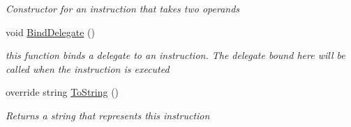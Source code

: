 \begin{DoxyCompactItemize}
\begin{DoxyCompactList}\small\item\em Constructor for an instruction that takes two operands \end{DoxyCompactList}\item 
void \hyperlink{class_c_p_u___o_s___simulator_1_1_c_p_u_1_1_instruction_ab3bbd51fd889e3bbeb656ea717a7fe9c}{Bind\+Delegate} ()
\begin{DoxyCompactList}\small\item\em this function binds a delegate to an instruction. The delegate bound here will be called when the instruction is executed \end{DoxyCompactList}\item 
override string \hyperlink{class_c_p_u___o_s___simulator_1_1_c_p_u_1_1_instruction_a7d3a81ead6e3639f970901d8e898f02c}{To\+String} ()
\begin{DoxyCompactList}\small\item\em Returns a string that represents this instruction \end{DoxyCompactList}\end{DoxyCompactItemize}
